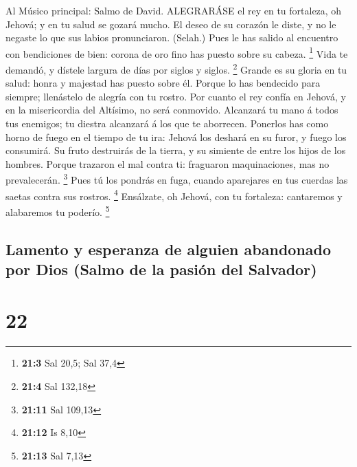  Al Músico principal: Salmo de David. ALEGRARÁSE el rey en
tu fortaleza, oh Jehová; y en tu salud se gozará mucho.  El
deseo de su corazón le diste, y no le negaste lo que sus labios
pronunciaron. (Selah.)  Pues le has salido al encuentro con
bendiciones de bien: corona de oro fino has puesto sobre su cabeza.
\footnote{\textbf{21:3} Sal 20,5; Sal 37,4}  Vida te
demandó, y dístele largura de días por siglos y siglos. \footnote{\textbf{21:4}
  Sal 132,18}  Grande es su gloria en tu salud: honra y
majestad has puesto sobre él.  Porque lo has bendecido para
siempre; llenástelo de alegría con tu rostro.  Por cuanto el
rey confía en Jehová, y en la misericordia del Altísimo, no será
conmovido.  Alcanzará tu mano á todos tus enemigos; tu
diestra alcanzará á los que te aborrecen.  Ponerlos has como
horno de fuego en el tiempo de tu ira: Jehová los deshará en su furor, y
fuego los consumirá.  Su fruto destruirás de la tierra, y
su simiente de entre los hijos de los hombres.  Porque
trazaron el mal contra ti: fraguaron maquinaciones, mas no prevalecerán.
\footnote{\textbf{21:11} Sal 109,13}  Pues tú los pondrás
en fuga, cuando aparejares en tus cuerdas las saetas contra sus rostros.
\footnote{\textbf{21:12} Is 8,10}  Ensálzate, oh Jehová,
con tu fortaleza: cantaremos y alabaremos tu poderío. \footnote{\textbf{21:13}
  Sal 7,13}

\hypertarget{lamento-y-esperanza-de-alguien-abandonado-por-dios-salmo-de-la-pasiuxf3n-del-salvador}{%
\subsection{Lamento y esperanza de alguien abandonado por Dios (Salmo de
la pasión del
Salvador)}\label{lamento-y-esperanza-de-alguien-abandonado-por-dios-salmo-de-la-pasiuxf3n-del-salvador}}

\hypertarget{section-21}{%
\section{22}\label{section-21}}

